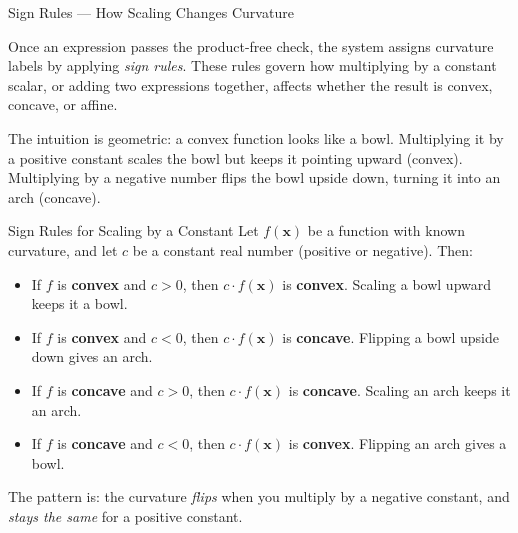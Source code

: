 \documentclass[aspectratio=169,10pt]{beamer}
\begin{document}
\begin{frame}[allowframebreaks]{Sign Rules --- How Scaling Changes Curvature}

  Once an expression passes the product-free check, the system assigns
  curvature labels by applying \emph{sign rules}.  These rules govern
  how multiplying by a constant scalar, or adding two expressions
  together, affects whether the result is convex, concave, or affine.

  The intuition is geometric: a convex function looks like a bowl.
  Multiplying it by a positive constant scales the bowl but keeps it
  pointing upward (convex).  Multiplying by a negative number flips the
  bowl upside down, turning it into an arch (concave).

  \begin{block}{Sign Rules for Scaling by a Constant}
    Let $f(\mathbf{x})$ be a function with known curvature, and let
    $c$ be a constant real number (positive or negative).  Then:
    \begin{itemize}
      \item If $f$ is \textbf{convex} and $c > 0$, then
            $c \cdot f(\mathbf{x})$ is \textbf{convex}.
            Scaling a bowl upward keeps it a bowl.
      \item If $f$ is \textbf{convex} and $c < 0$, then
            $c \cdot f(\mathbf{x})$ is \textbf{concave}.
            Flipping a bowl upside down gives an arch.
      \item If $f$ is \textbf{concave} and $c > 0$, then
            $c \cdot f(\mathbf{x})$ is \textbf{concave}.
            Scaling an arch keeps it an arch.
      \item If $f$ is \textbf{concave} and $c < 0$, then
            $c \cdot f(\mathbf{x})$ is \textbf{convex}.
            Flipping an arch gives a bowl.
    \end{itemize}
    The pattern is: the curvature \emph{flips} when you multiply by
    a negative constant, and \emph{stays the same} for a positive
    constant.
  \end{block}


\end{frame}
\end{document}
